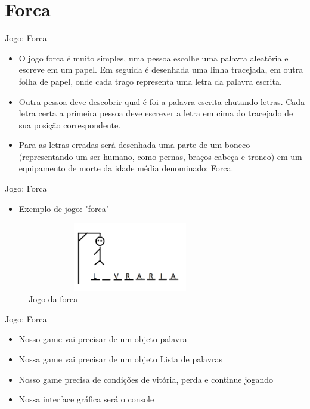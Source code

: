 \section{Forca}

\begin{frame}
	\begin{block}{Jogo: Forca}
		\begin{itemize}
			\item O jogo forca é muito simples, uma pessoa escolhe uma palavra aleatória e escreve em um papel. Em seguida é desenhada uma linha tracejada, em outra folha de papel, onde cada traço representa uma letra da palavra escrita.
			
			\item Outra pessoa deve descobrir qual é foi a palavra escrita chutando letras. Cada letra certa a primeira pessoa deve escrever a letra em cima do tracejado de sua posição correspondente.
			
			\item Para as letras erradas será desenhada uma parte de um boneco (representando um ser humano, como pernas, braços cabeça e tronco) em um equipamento de morte da idade média denominado: Forca.
		\end{itemize}
	\end{block}
\end{frame}

\begin{frame}
	\begin{block}{Jogo: Forca}
		\begin{itemize}
			\item Exemplo de jogo: "forca"
		\end{itemize}
		\begin{figure}[!htb]
			\centering	  				
			\includegraphics[height=3cm, width = 9cm]{./pic/forca.png}
			\caption{Jogo da forca \cite{Demonstre}}
			\label{fig_LLS_one}
		\end{figure}
	\end{block}
\end{frame}

\begin{frame}
	\begin{block}{Jogo: Forca}
		\begin{itemize}
			\item Nosso game vai precisar de um objeto palavra

			\item Nossa game vai precisar de um objeto Lista de palavras
		
			\item Nosso game precisa de condições de vitória, perda e continue jogando
		
			\item Nossa interface gráfica será o console
		\end{itemize}
	\end{block}
\end{frame}


